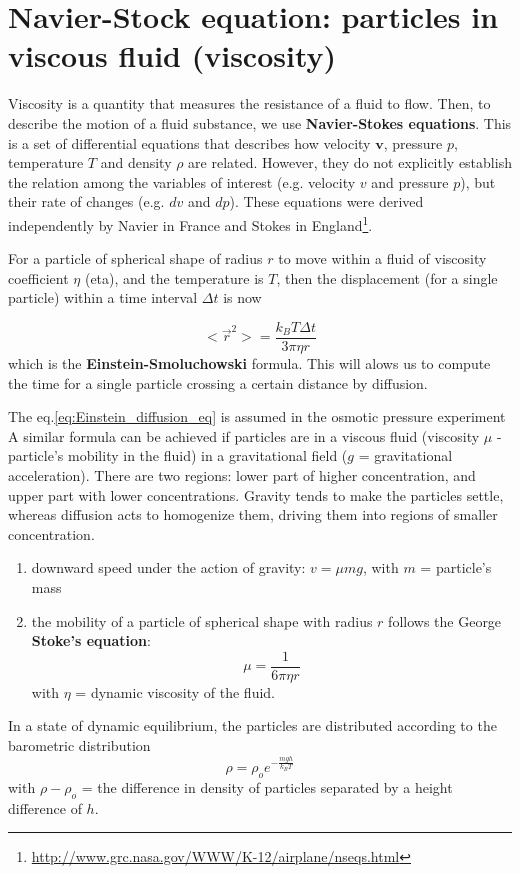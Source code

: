 \section{Navier-Stock equation: particles in viscous fluid (viscosity)}
\label{sec:viscosity}
\label{sec:navier-stock-equation}

Viscosity is a quantity that measures the resistance of a fluid to
flow. Then, to describe the motion of a fluid substance, we use
{\bf Navier-Stokes equations}. This is a set of differential equations
that describes how velocity $\mathbf{v}$, pressure $p$, temperature
$T$ and density $\rho$ are related. However, they do not explicitly
establish the relation among the variables of interest (e.g. velocity
$v$ and pressure $p$), but their rate of changes (e.g. $dv$ and
$dp$). These equations were derived independently by Navier in France
and Stokes in England\footnote{\url{http://www.grc.nasa.gov/WWW/K-12/airplane/nseqs.html}}.

For a particle of spherical shape of radius $r$ to move within a
fluid of  viscosity coefficient $\eta$ (eta), and the
temperature is $T$, then the displacement (for a single particle)
within a time interval $\Delta t$ is now

\begin{equation}
  <\overrightarrow r^2> = \frac{k_BT \Delta t}{3\pi \eta r}
\end{equation}
which is the {\bf Einstein-Smoluchowski} formula. This will alows us
to compute the time for a single particle crossing a certain distance
by diffusion.

The eq.\ref{eq:Einstein_diffusion_eq} is assumed in the osmotic pressure
experiment A similar formula can be achieved if particles are in a viscous fluid
(viscosity $\mu$ - particle's mobility in the fluid) in a gravitational field
($g$ = gravitational acceleration). There are two regions:
lower part of higher concentration, and upper part with lower concentrations. Gravity tends to make
the particles settle, whereas diffusion acts to homogenize them, driving them
into regions of smaller concentration.
\begin{enumerate}
  \item downward speed under the action of gravity: $v = \mu mg$, with $m$ =
  particle's mass
  
  \item the mobility of a particle of spherical shape  with radius $r$ follows
  the George {\bf Stoke's equation}:
\begin{equation}
\mu = \frac{1}{6\pi \eta r}
\end{equation}
with $\eta$ = dynamic viscosity of the fluid.
\end{enumerate}
 In a state of dynamic equilibrium, the particles are distributed according to
the barometric distribution
\begin{equation}
\rho = \rho_o e^{-\frac{mgh}{k_BT}}
\end{equation}
with $\rho - \rho_o$ = the difference in density of particles separated by a
height difference of $h$.
